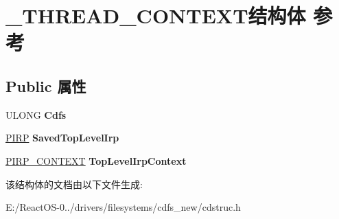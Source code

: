 \hypertarget{struct___t_h_r_e_a_d___c_o_n_t_e_x_t}{}\section{\+\_\+\+T\+H\+R\+E\+A\+D\+\_\+\+C\+O\+N\+T\+E\+X\+T结构体 参考}
\label{struct___t_h_r_e_a_d___c_o_n_t_e_x_t}
\subsection*{Public 属性}
\begin{DoxyCompactItemize}
\item 
\mbox{\label{struct___t_h_r_e_a_d___c_o_n_t_e_x_t_a501116fe4cf18e0d61999a637e06aae2}} 
U\+L\+O\+NG {\bfseries Cdfs}
\item 
\mbox{\label{struct___t_h_r_e_a_d___c_o_n_t_e_x_t_af28e114afd471365b0170f571f2c6989}} 
\hyperlink{interfacevoid}{P\+I\+RP} {\bfseries Saved\+Top\+Level\+Irp}
\item 
\mbox{\label{struct___t_h_r_e_a_d___c_o_n_t_e_x_t_ae88c73bc52aef0da6bd96feb192133cd}} 
\hyperlink{struct_i_r_p___c_o_n_t_e_x_t}{P\+I\+R\+P\+\_\+\+C\+O\+N\+T\+E\+XT} {\bfseries Top\+Level\+Irp\+Context}
\end{DoxyCompactItemize}


该结构体的文档由以下文件生成\+:\begin{DoxyCompactItemize}
\item 
E\+:/\+React\+O\+S-\/0../drivers/filesystems/cdfs\+\_\+new/cdstruc.\+h\end{DoxyCompactItemize}
